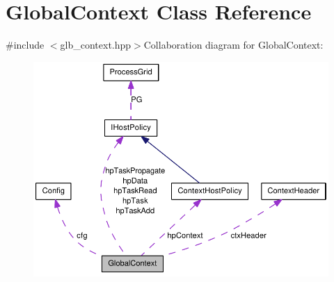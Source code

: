 \hypertarget{class_global_context}{
\section{GlobalContext Class Reference}
\label{class_global_context}
}


{\ttfamily \#include $<$glb\_\-context.hpp$>$}Collaboration diagram for GlobalContext:\nopagebreak
\begin{figure}[H]
\begin{center}
\leavevmode
\includegraphics[width=400pt]{class_global_context__coll__graph}
\end{center}
\end{figure}
